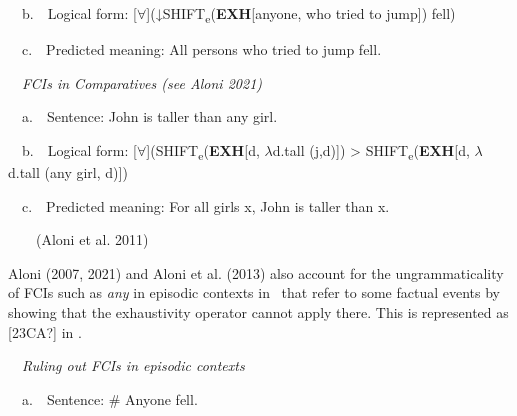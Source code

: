 \begin{styleStandard}
\ \ b.\ \ Logical form: [${\forall}$](↓\textsc{SHIFT}\textsubscript{e}(\textbf{EXH}[anyone, who tried to jump]) fell)
\end{styleStandard}

\begin{styleStandard}
\ \ c.\ \ Predicted meaning: All persons who tried to jump fell.
\end{styleStandard}

\begin{styleStandard}
\label{bkm:Ref54857674}\ \ \textit{FCIs in Comparatives (see Aloni 2021)}
\end{styleStandard}

\begin{styleStandard}
\ \ a.\ \ Sentence: John is taller than any girl.
\end{styleStandard}

\begin{styleStandard}
\ \ b.\ \ Logical form: [${\forall}$](\textsc{SHIFT}\textsubscript{e}(\textbf{EXH}[d, $\lambda $d.tall (j,d)]) {\textgreater} \textsc{SHIFT}\textsubscript{e}(\textbf{EXH}[d, $\lambda $d.tall (any girl, d)])
\end{styleStandard}

\begin{styleStandard}
\ \ c.\ \ Predicted meaning: For all girls x, John is taller than x.
\end{styleStandard}

\begin{styleStandard}
\ \ \ \ (Aloni et al. 2011)
\end{styleStandard}

\begin{styleStandard}
Aloni (2007, 2021) and Aloni et al. (2013) also account for the ungrammaticality of FCIs such as \textit{any} in episodic contexts in \ that refer to some factual events by showing that the exhaustivity operator cannot apply there. This is represented as [23CA?] in . 
\end{styleStandard}

\begin{styleStandard}
\label{bkm:Ref517204}\ \ \textit{Ruling out FCIs in episodic contexts }
\end{styleStandard}

\begin{styleStandard}
\ \ a.\ \ Sentence: \# Anyone fell.
\end{styleStandard}

